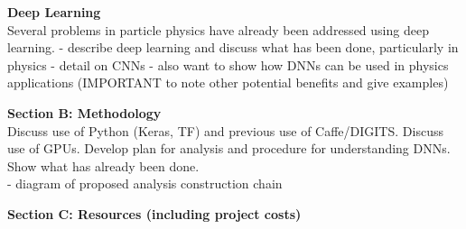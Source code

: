\documentclass[11pt,a4paper]{article}
\begin{document}
\noindent\textbf{Deep Learning}\\
Several problems in particle physics have already been addressed using deep learning.
- describe deep learning and discuss what has been done, particularly in physics
- detail on CNNs
- also want to show how DNNs can be used in physics applications (IMPORTANT to note other potential benefits and give examples)

{\noindent\textbf{Section B: Methodology}}\\
Discuss use of Python (Keras, TF) and previous use of Caffe/DIGITS.  Discuss use of GPUs.  Develop plan for analysis and procedure for understanding DNNs.  Show what has already been done.\\

- diagram of proposed analysis construction chain

{\noindent\textbf{Section C: Resources (including project costs)}}\\


\end{document}
